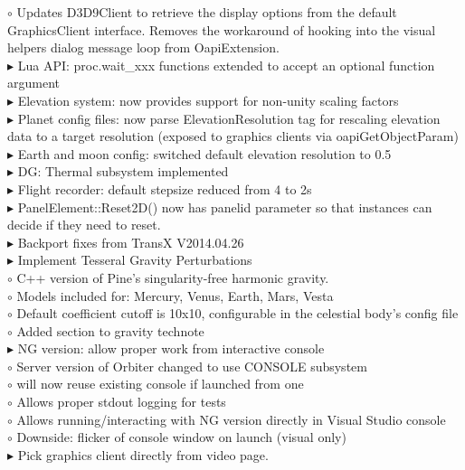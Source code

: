\documentclass[Orbiter User Manual.tex]{subfiles}
\begin{document}
\begin{sloppypar}
$\circ$ Updates D3D9Client to retrieve the display options from the default GraphicsClient interface. Removes the workaround of hooking into the visual helpers dialog message loop from OapiExtension.\\
$\blacktriangleright$ Lua API: proc.wait\_xxx functions extended to accept an optional function argument\\
$\blacktriangleright$ Elevation system: now provides support for non-unity scaling factors\\
$\blacktriangleright$ Planet config files: now parse ElevationResolution tag for rescaling elevation data to a target resolution (exposed to graphics clients via oapiGetObjectParam)\\
$\blacktriangleright$ Earth and moon config: switched default elevation resolution to 0.5\\
$\blacktriangleright$ DG: Thermal subsystem implemented\\
$\blacktriangleright$ Flight recorder: default stepsize reduced from 4 to 2s\\
$\blacktriangleright$ PanelElement::Reset2D() now has panelid parameter so that instances can decide if they need to reset.\\
$\blacktriangleright$ Backport fixes from TransX V2014.04.26\\
$\blacktriangleright$ Implement Tesseral Gravity Perturbations\\
$\circ$ C++ version of Pine's singularity-free harmonic gravity.\\
$\circ$ Models included for: Mercury, Venus, Earth, Mars, Vesta\\
$\circ$ Default coefficient cutoff is 10x10, configurable in the celestial body's config file\\
$\circ$ Added section to gravity technote\\
$\blacktriangleright$ NG version: allow proper work from interactive console\\
$\circ$ Server version of Orbiter changed to use CONSOLE subsystem\\
$\circ$ will now reuse existing console if launched from one\\
$\circ$ Allows proper stdout logging for tests\\
$\circ$ Allows running/interacting with NG version directly in Visual Studio console\\
$\circ$ Downside: flicker of console window on launch (visual only)\\
$\blacktriangleright$ Pick graphics client directly from video page.\\

\end{sloppypar}
\end{document}
